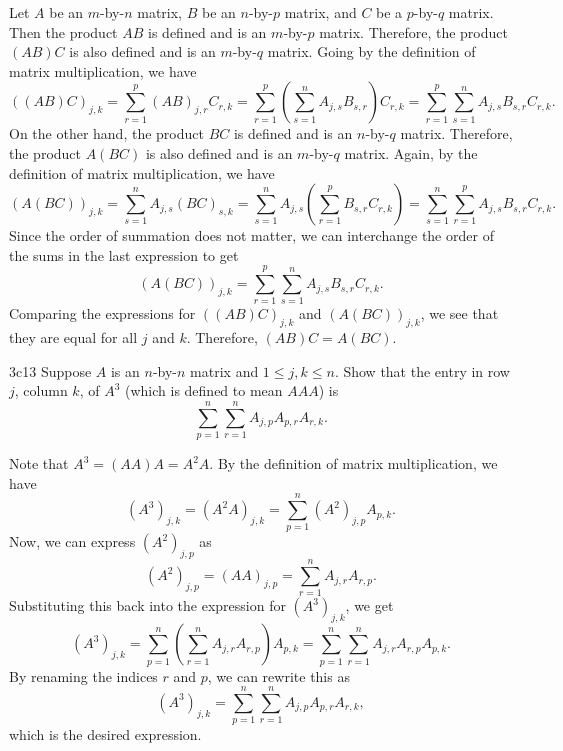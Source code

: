 \begin{sol}
    Let $A$ be an $m$-by-$n$ matrix, $B$ be an $n$-by-$p$ matrix, and $C$ be a $p$-by-$q$ matrix.
	Then the product $AB$ is defined and is an $m$-by-$p$ matrix.
	Therefore, the product $(AB)C$ is also defined and is an $m$-by-$q$ matrix.
	Going by the definition of matrix multiplication, we have
    \[
    	((AB)C)_{j, k} = \sum_{r = 1}^{p} (AB)_{j, r} C_{r, k} = \sum_{r = 1}^{p} \left( \sum_{s = 1}^{n} A_{j, s} B_{s, r} \right) C_{r, k} = \sum_{r = 1}^{p} \sum_{s = 1}^{n} A_{j, s} B_{s, r} C_{r, k}.
    \]
    On the other hand, the product $BC$ is defined and is an $n$-by-$q$ matrix.
	Therefore, the product $A(BC)$ is also defined and is an $m$-by-$q$ matrix.
	Again, by the definition of matrix multiplication, we have
    \[
    	(A(BC))_{j, k} = \sum_{s = 1}^{n} A_{j, s} (BC)_{s, k} = \sum_{s = 1}^{n} A_{j, s} \left( \sum_{r = 1}^{p} B_{s, r} C_{r, k} \right) = \sum_{s = 1}^{n} \sum_{r = 1}^{p} A_{j, s} B_{s, r} C_{r, k}.
    \]
    Since the order of summation does not matter, we can interchange the order of the sums in the last expression to get
    \[
    	(A(BC))_{j, k} = \sum_{r = 1}^{p} \sum_{s = 1}^{n} A_{j, s} B_{s, r} C_{r, k}.
    \]
    Comparing the expressions for $((AB)C)_{j, k}$ and $(A(BC))_{j, k}$, we see that they are equal for all $j$ and $k$.
	Therefore, $(AB)C = A(BC)$.
\end{sol}

\begin{exercise}{3c13}
    Suppose $A$ is an $n$-by-$n$ matrix and $1 \leq j, k \leq n$.
	Show that the entry in row $j$, column $k$, of $A^3$ (which is defined to mean $AAA$) is
    \[
    	\sum_{p = 1}^{n} \sum_{r = 1}^{n} A_{j, p} A_{p, r} A_{r, k}.
    \]
\end{exercise}

\begin{sol}
    Note that $A^3 = (AA)A = A^2 A$.
	By the definition of matrix multiplication, we have
    \[
    	(A^3)_{j, k} = (A^2 A)_{j, k} = \sum_{p = 1}^{n} (A^2)_{j, p} A_{p, k}.
    \]
    Now, we can express $(A^2)_{j, p}$ as
    \[
    	(A^2)_{j, p} = (AA)_{j, p} = \sum_{r = 1}^{n} A_{j, r} A_{r, p}.
    \]
    Substituting this back into the expression for $(A^3)_{j, k}$, we get
    \[
    	(A^3)_{j, k} = \sum_{p = 1}^{n} \left( \sum_{r = 1}^{n} A_{j, r} A_{r, p} \right) A_{p, k} = \sum_{p = 1}^{n} \sum_{r = 1}^{n} A_{j, r} A_{r, p} A_{p, k}.
    \]
    By renaming the indices $r$ and $p$, we can rewrite this as
    \[
    	(A^3)_{j, k} = \sum_{p = 1}^{n} \sum_{r = 1}^{n} A_{j, p} A_{p, r} A_{r, k},
    \]
    which is the desired expression.
\end{sol}

